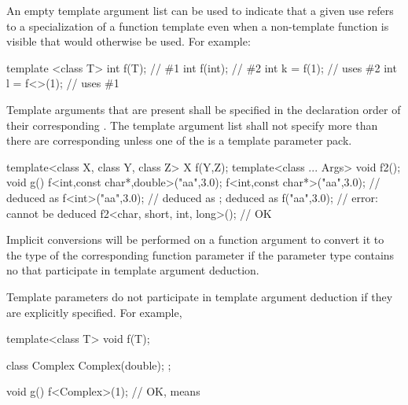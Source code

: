 \pnum
\begin{note}
An empty template argument list can be used to indicate that a given
use refers to a specialization of a function template even when a
non-template function is visible that would otherwise be used.
For example:

\begin{codeblock}
template <class T> int f(T);    // \#1
int f(int);                     // \#2
int k = f(1);                   // uses \#2
int l = f<>(1);                 // uses \#1
\end{codeblock}
\end{note}

\pnum
Template arguments that are present shall be specified in the declaration
order of their corresponding
.
The template argument list shall not specify more
than there are corresponding
unless one of the  is a template
parameter pack.
\begin{example}

\begin{codeblock}
template<class X, class Y, class Z> X f(Y,Z);
template<class ... Args> void f2();
void g() {
  f<int,const char*,double>("aa",3.0);
  f<int,const char*>("aa",3.0); //  deduced as 
  f<int>("aa",3.0);             //  deduced as ;  deduced as 
  f("aa",3.0);                  // error:  cannot be deduced
  f2<char, short, int, long>(); // OK
}
\end{codeblock}
\end{example}

\pnum
Implicit conversions will be performed on a function argument
to convert it to the type of the corresponding function parameter if
the parameter type contains no
that participate in template argument deduction.
\begin{note}
Template parameters do not participate in template argument deduction if
they are explicitly specified.
For example,

\begin{codeblock}
template<class T> void f(T);

class Complex {
  Complex(double);
};

void g() {
  f<Complex>(1);    // OK, means 
}
\end{codeblock}
\end{note}


